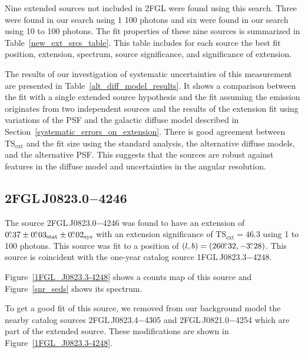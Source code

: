 \documentclass[12pt,preprint]{aastex}
\newcommand{\gev}{\text{GeV}\xspace}
\newcommand{\tsext}{{\ensuremath{\text{TS}_{\text{ext}}}}\xspace}
\newcommand{\sys}{\text{sys}\xspace}
\newcommand{\stat}{\text{stat}\xspace}
\newcommand{\hl}[1]{#1}
\begin{document}

Nine extended sources not included in 2FGL were found using this search.
Three were found in our search using 1 \gev 100 \gev photons and six were
found in our search using 10 \gev to 100 \gev photons.  The fit properties of
these nine sources is summarized in Table~\ref{new_ext_srcs_table}.
This table includes for each source the best fit position, extension,
spectrum, source significance, and significance of extension.

The results of our investigation of systematic uncertainties of this
measurement are presented in 
Table~\ref{alt_diff_model_results}.  It
shows a comparison between the fit with a single extended source
hypothesis and the fit assuming the emission originates from two
independent sources and  the
results of the extension fit using variations of the PSF and the galactic
diffuse model described in Section~\ref{systematic_errors_on_extension}.
There is good agreement between \tsext and the fit size using
the standard analysis, the alternative diffuse models, and the alternative PSF.
This suggests that the sources are robust against features in the diffuse
model and uncertainties in the angular resolution.

\subsection{2FGL\,J0823.0$-$4246}
\label{section_2FGL_J0823.0-4246}


The source 2FGL\,J0823.0$-$4246 was found 
to have an 
extension of $0\fdg37\pm0\fdg03_\stat\pm0\fdg02_\sys$ 
with an extension
significance of $\tsext=46.3$
using 1 \gev to 100 \gev photons.  This source was fit to a position of
$(l,b)=(260\mbox{$.\!\!^\circ$}32,-3\mbox{$.\!\!^\circ$}28)$.  
This source is coincident with the one-year
catalog source 1FGL\,J0823.3$-$4248.
\hl{
Figure~\ref{1FGL_J0823.3-4248} shows a
counts map of this source
and Figure~\ref{snr_seds} shows its spectrum.
}
To get a good fit of this source, we removed from our background
model the nearby catalog
sources 2FGL\,J0823.4$-$4305 and 2FGL\,J0821.0$-$4254 which are part of the
extended source.  These modifications are
shown in Figure~\ref{1FGL_J0823.3-4248}.
\end{document}

